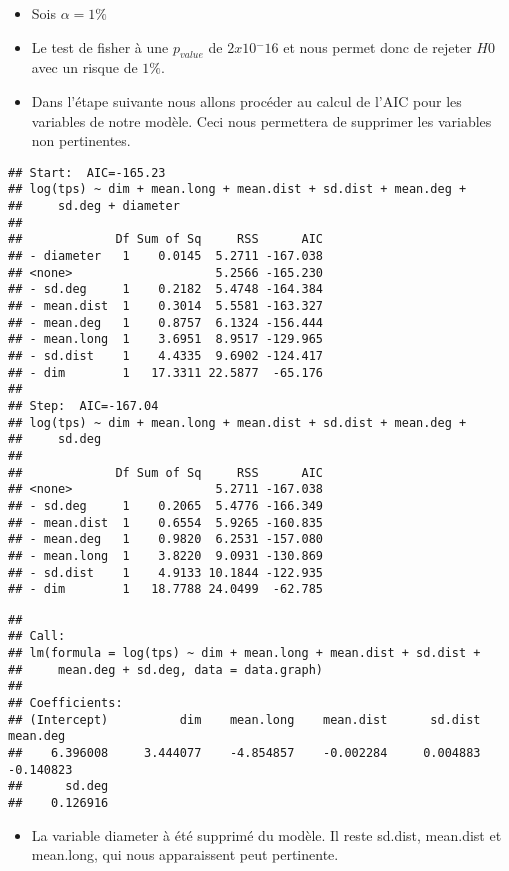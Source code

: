 \documentclass[
]{article}
\providecommand{\tightlist}{%
  \setlength{\itemsep}{0pt}\setlength{\parskip}{0pt}}
\begin{document}
\begin{itemize}
\tightlist
\item
  Sois \(\alpha = 1\%\)
\item
  Le test de fisher à une \(p_{value}\) de \(2x10{^-16}\) et nous permet
  donc de rejeter \(H0\) avec un risque de \(1\%\).
\item
  Dans l'étape suivante nous allons procéder au calcul de l'AIC pour les
  variables de notre modèle. Ceci nous permettera de supprimer les
  variables non pertinentes.
\end{itemize}

\begin{verbatim}
## Start:  AIC=-165.23
## log(tps) ~ dim + mean.long + mean.dist + sd.dist + mean.deg + 
##     sd.deg + diameter
## 
##             Df Sum of Sq     RSS      AIC
## - diameter   1    0.0145  5.2711 -167.038
## <none>                    5.2566 -165.230
## - sd.deg     1    0.2182  5.4748 -164.384
## - mean.dist  1    0.3014  5.5581 -163.327
## - mean.deg   1    0.8757  6.1324 -156.444
## - mean.long  1    3.6951  8.9517 -129.965
## - sd.dist    1    4.4335  9.6902 -124.417
## - dim        1   17.3311 22.5877  -65.176
## 
## Step:  AIC=-167.04
## log(tps) ~ dim + mean.long + mean.dist + sd.dist + mean.deg + 
##     sd.deg
## 
##             Df Sum of Sq     RSS      AIC
## <none>                    5.2711 -167.038
## - sd.deg     1    0.2065  5.4776 -166.349
## - mean.dist  1    0.6554  5.9265 -160.835
## - mean.deg   1    0.9820  6.2531 -157.080
## - mean.long  1    3.8220  9.0931 -130.869
## - sd.dist    1    4.9133 10.1844 -122.935
## - dim        1   18.7788 24.0499  -62.785
\end{verbatim}

\begin{verbatim}
## 
## Call:
## lm(formula = log(tps) ~ dim + mean.long + mean.dist + sd.dist + 
##     mean.deg + sd.deg, data = data.graph)
## 
## Coefficients:
## (Intercept)          dim    mean.long    mean.dist      sd.dist     mean.deg  
##    6.396008     3.444077    -4.854857    -0.002284     0.004883    -0.140823  
##      sd.deg  
##    0.126916
\end{verbatim}

\begin{itemize}
\tightlist
\item
  La variable diameter à été supprimé du modèle. Il reste sd.dist,
  mean.dist et mean.long, qui nous apparaissent peut pertinente.
\end{itemize}
\end{document}
